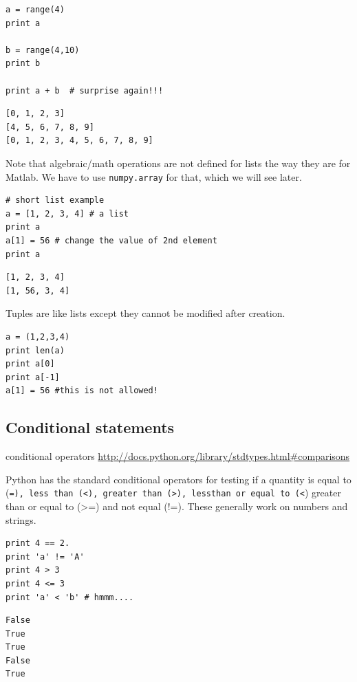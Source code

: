 \documentclass[11pt]{article}
\begin{document}
\begin{verbatim}
a = range(4)
print a

b = range(4,10)
print b

print a + b  # surprise again!!!
\end{verbatim}

\begin{verbatim}
[0, 1, 2, 3]
[4, 5, 6, 7, 8, 9]
[0, 1, 2, 3, 4, 5, 6, 7, 8, 9]
\end{verbatim}

Note that algebraic/math operations are not defined for lists the way they are for Matlab. We have to use \texttt{numpy.array} for that, which we will see later.

\begin{verbatim}
# short list example
a = [1, 2, 3, 4] # a list
print a
a[1] = 56 # change the value of 2nd element
print a
\end{verbatim}

\begin{verbatim}
[1, 2, 3, 4]
[1, 56, 3, 4]
\end{verbatim}

Tuples are like lists except they cannot be modified after creation.

\begin{verbatim}
a = (1,2,3,4)
print len(a)
print a[0]
print a[-1]
a[1] = 56 #this is not allowed!
\end{verbatim}


\subsection{Conditional statements}
\label{sec-3-4}
conditional operators \url{http://docs.python.org/library/stdtypes.html#comparisons}

Python has the standard conditional operators for testing if a quantity is equal to (\texttt{=), less than (<), greater than (>), lessthan or equal to (<}) greater than or equal to (>=) and not equal (!=). These generally work on numbers and strings.

\begin{verbatim}
print 4 == 2.
print 'a' != 'A'
print 4 > 3
print 4 <= 3
print 'a' < 'b' # hmmm....
\end{verbatim}

\begin{verbatim}
False
True
True
False
True
\end{verbatim}
\end{document}
